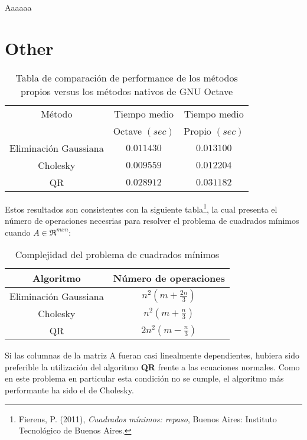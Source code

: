 \documentclass[%
	final,
	reprint,
	notitlepage,
	narroweqnarray,
	inline,
	twoside,
	invited
	]{ieee}
\begin{document}
\par Aaaaaa

\section{Other}

\begin{table}[H]
\begin{center}
\begin{tabular}{|c|c|c|}
\hline
Método & Tiempo medio & Tiempo  medio \\
 &  Octave $(sec)$ & Propio $(sec)$ \\
\hline
\hline
Eliminación Gaussiana & $0.011430$ & $0.013100$ \\
Cholesky & $0.009559$ & $0.012204$ \\
 QR &  $0.028912$&$0.031182$ \\
\hline  
\end{tabular}
\end{center}
\caption{Tabla de comparación de performance de los métodos propios versus los métodos nativos de GNU Octave}
\label{tmedio}
\end{table}

Estos resultados son consistentes con la siguiente tabla\footnote{Fierens, P. (2011), \emph{Cuadrados mínimos: repaso}, Buenos Aires: Instituto Tecnológico de Buenos Aires.}, la cual presenta el número de operaciones necesrias para resolver el problema de cuadrados mínimos cuando $A \in \Re ^{mxn}$:


\begin{table}[H]
\begin{center}
\begin{tabular}{|c|c|}
\hline
Algoritmo & Número de operaciones\\
\hline
\hline

Eliminación Gaussiana & $n^2(m+\frac{2n}{3})$\\
Cholesky & $n^2(m+\frac{n}{3})$\\
QR & $2n^2(m-\frac{n}{3})$\\

\hline  
\end{tabular}
\end{center}
\caption{Complejidad del problema de cuadrados mínimos}
\label{tmedio}
\end{table}

Si las columnas de la matriz A fueran casi linealmente dependientes, hubiera sido preferible la utilización del algoritmo \textbf{QR} frente a las ecuaciones normales. Como en este problema en particular esta condición no se cumple, el algoritmo más performante ha sido el de Cholesky.
\end{document}
